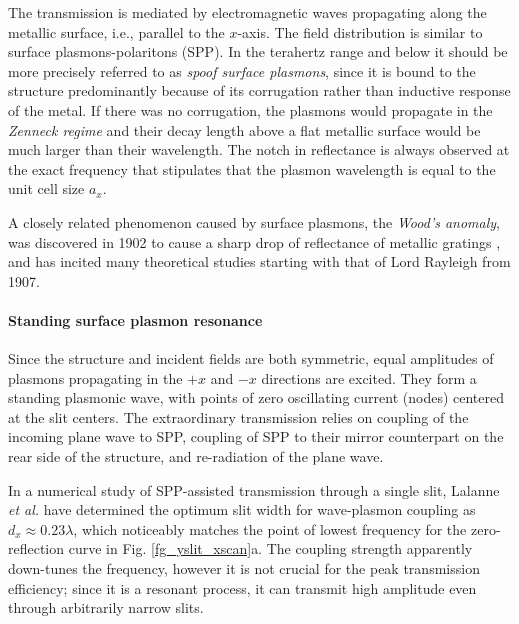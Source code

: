 The transmission is mediated by electromagnetic waves propagating along the metallic surface, i.e., parallel to the $x$-axis.  %
The field distribution is similar to surface plasmons-polaritons (SPP). In the terahertz range and below it should be more precisely referred to as \textit{spoof surface plasmons}, since it is bound to the structure predominantly because of its corrugation rather than inductive response of the metal. If there was no corrugation, the plasmons would propagate in the \textit{Zenneck regime} \cite{navarro-cia2013terahertz} and their decay length above a flat metallic surface would be much larger than their wavelength. 
The notch in reflectance is always observed at the exact frequency that stipulates that the plasmon wavelength is equal to the unit cell size $a_x$.

A closely related phenomenon  caused by surface plasmons, the \textit{Wood's anomaly}, was discovered in 1902 to cause a sharp drop of reflectance of metallic gratings \cite{wood1902remarkable}, and has incited many theoretical studies starting with that of Lord Rayleigh \cite{rayleigh1907dynamical} from 1907.  %

\paragraph{Standing surface plasmon resonance} %
Since the structure and incident fields are both symmetric, equal amplitudes of plasmons propagating in the $+x$ and $-x$ directions are excited. They form a standing plasmonic wave, with points of zero oscillating current (nodes) centered at the slit centers. The extraordinary transmission relies on coupling of the incoming plane wave to SPP, coupling of SPP to their mirror counterpart on the rear side of the structure, and re-radiation of the plane wave. 

In a numerical study of SPP-assisted transmission through a single slit, Lalanne \textit{et al.} have determined \cite{lalanne2005theory} the optimum slit width for wave-plasmon coupling as $d_x \approx 0.23 \lambda$, which noticeably matches the point of lowest frequency for the zero-reflection curve in Fig. \ref{fg_yslit_xscan}a. The coupling strength apparently down-tunes the frequency, however it is not crucial for the peak transmission efficiency; since it is a resonant process, it can transmit high amplitude even through arbitrarily narrow slits. 


